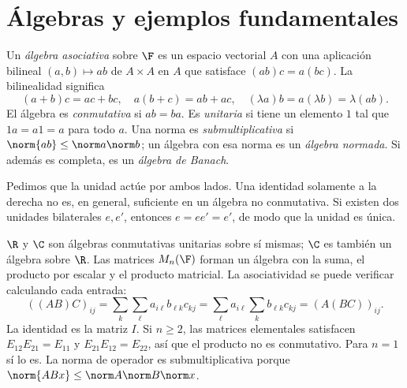 \section{Álgebras y ejemplos fundamentales}
\begin{definicion}
Un \emph{álgebra asociativa} sobre $\F$ es un espacio vectorial $A$ con una aplicación bilineal $(a,b)\mapsto ab$ de $A\times A$ en $A$ que satisface $(ab)c=a(bc)$. La bilinealidad significa
\[
 (a+b)c=ac+bc,\quad a(b+c)=ab+ac,\quad
 (\lambda a)b=a(\lambda b)=\lambda(ab).
\]
El álgebra es \emph{conmutativa} si $ab=ba$. Es \emph{unitaria} si tiene un elemento $1$ tal que $1a=a1=a$ para todo $a$. Una norma es \emph{submultiplicativa} si $\norm{ab}\le\norm a\norm b$; un álgebra con esa norma es un \emph{álgebra normada}. Si además es completa, es un \emph{álgebra de Banach}.
\end{definicion}

Pedimos que la unidad actúe por ambos lados. Una identidad solamente a la derecha no es, en general, suficiente en un álgebra no conmutativa. Si existen dos unidades bilaterales $e,e'$, entonces $e=ee'=e'$, de modo que la unidad es única.

\begin{ejemplo}
$\R$ y $\C$ son álgebras conmutativas unitarias sobre sí mismas; $\C$ es también un álgebra sobre $\R$. Las matrices $M_n(\F)$ forman un álgebra con la suma, el producto por escalar y el producto matricial. La asociatividad se puede verificar calculando cada entrada:
\[
 ((AB)C)_{ij}=\sum_k\sum_\ell a_{i\ell}b_{\ell k}c_{kj}
 =\sum_\ell a_{i\ell}\sum_kb_{\ell k}c_{kj}=(A(BC))_{ij}.
\]
La identidad es la matriz $I$. Si $n\ge2$, las matrices elementales satisfacen $E_{12}E_{21}=E_{11}$ y $E_{21}E_{12}=E_{22}$, así que el producto no es conmutativo. Para $n=1$ sí lo es. La norma de operador es submultiplicativa porque $\norm{ABx}\le\norm A\norm B\norm x$.
\end{ejemplo}

